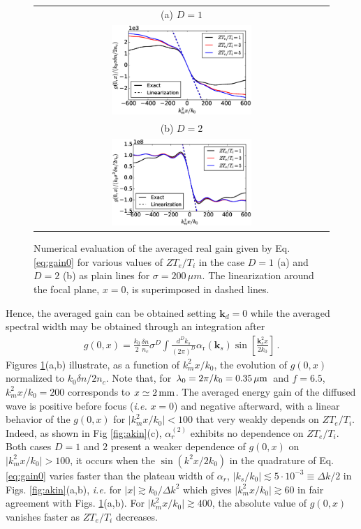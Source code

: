 \documentclass[
 reprint,
 amsmath,amssymb,
 aps,
]{revtex4-1}
\begin{document}
 \begin{figure}
\begin{tabular}{c}
(a) $D=1$ \\
\includegraphics[width=0.49\textwidth]{int_akin_sin.eps}\\
(b) $D=2$ \\
\includegraphics[width=0.49\textwidth]{int_akin_sin_D2.eps}
\end{tabular}
\caption{ \label{fig:intakinsin}
Numerical evaluation of the averaged real gain given by Eq. \eqref{eq:gain0} for various values of $ZT_e/T_i$ in the case $D=1$ (a) and $D=2$ (b) as plain lines for $\sigma = 200 \,\mu m$. The linearization around the focal plane, $x=0$, is superimposed in dashed lines. 
 }
\end{figure}
Hence, the averaged gain can be obtained setting $\mathbf{k}_d=0$ while the averaged spectral width may be obtained through an integration after
\begin{align}
g(0,x)=  \frac{k_0}{2}  \frac{\delta n}{n_c}
  \sigma^D \int \frac{d^Dk_s}{(2\pi)^D}  \alpha_\mathrm{r}(\mathbf{k}_s) 
\sin\left[ \frac{\mathbf{k}_s^2 x}{2k_0}\right]
\, . \label{eq:gain0}
\end{align}
Figures \ref{fig:intakinsin}(a,b) illustrate, as a function of $k_m^2 x /k_0$, the evolution of $g(0,x)$
normalized to $k_0\delta n / 2n_c$. Note that, for $\lambda_0=2\pi/k_0=0.35\,\rm\mu m$ and $f=6.5$,  $k_m^2 x /k_0=200$ corresponds to $x\simeq 2\,\rm mm$. 
The averaged energy gain of the diffused wave is positive before focus (\emph{i.e.} $x=0$) and negative afterward, with  a linear behavior of the $g(0,x)$ for  $\vert k_m^2 x /k_0 \vert < 100$  that very weakly depends on $ZT_e/T_i$.  Indeed, as shown in Fig \ref{fig:akin}(c), $\alpha_r^{(2)}$ exhibits no dependence  on $ZT_e/T_i$. Both cases $D=1$ and $2$ present a weaker dependence of $g(0,x)$ on $\vert k_m^2 x /k_0 \vert > 100$, it occurs when the $\sin(k^2x/2k_0)$ in the quadrature of Eq. \eqref{eq:gain0} varies faster than the plateau width of $\alpha_r$, $\vert k_s/k_0\vert \lesssim 5\cdot 10^{-3}\equiv \Delta k /2$ in Figs. \ref{fig:akin}(a,b), \emph{i.e.} for $\vert x\vert \gtrsim k_0/\Delta k^2$ which gives $\vert k_m^2x/k_0 \vert  \gtrsim 60  $ in fair  agreement with Figs. \ref{fig:intakinsin}(a,b).
For $\vert k_m^2 x /k_0 \vert \gtrsim 400$, the absolute value of $g(0,x)$ vanishes faster as $ZT_e/T_i$ decreases. 
\end{document}
